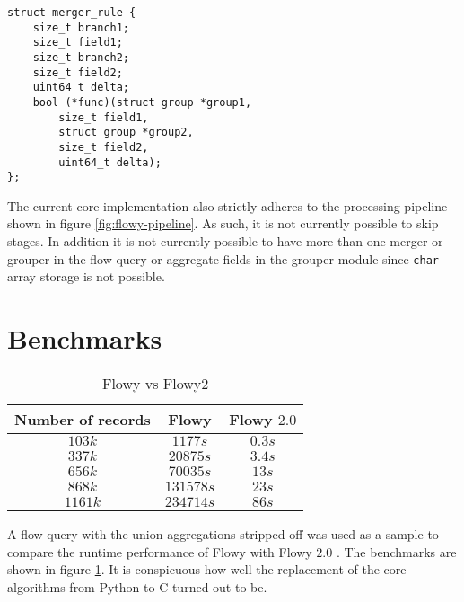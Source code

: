 \begin{lstlisting}
struct merger_rule {
	size_t branch1;
	size_t field1;
	size_t branch2;
	size_t field2;
	uint64_t delta;
	bool (*func)(struct group *group1,
		size_t field1,
		struct group *group2,
		size_t field2,
		uint64_t delta);
};
\end{lstlisting}

The current core implementation also strictly adheres to the processing
pipeline shown in figure \ref{fig:flowy-pipeline}. As such, it is not
currently possible to skip  stages. In addition it
is not currently possible to have more than one merger or grouper in the
flow-query or aggregate fields in the grouper module since \texttt{char} array
storage is not possible.


\section{Benchmarks}\label{sec:benchmarks}

\begin{table}[h!]
	\begin{center}
		\begin{tabular}{|c|c|c|}
		\hline
		Number of records & Flowy & Flowy $2.0$ \\
		\hline
		\hline
		$103k$ & $1177s$ & $0.3s$\\
		\hline
		$337k$ & $20875s$ & $3.4s$\\
		\hline
		$656k$ & $70035s$ & $13s$\\
		\hline
		$868k$ & $131578s$ & $23s$\\
		\hline
		$1161k$ & $234714s$ & $86s$\\
		\hline
		\end{tabular}
	\end{center}
\caption{Flowy vs Flowy2 \cite{jschauer:thesis:2011}}
\label{tab:flowy2-benchmarks}
\end{table}

A flow query with the union aggregations stripped off was used as a sample to
compare the runtime performance of Flowy \cite{kkanev:thesis:2009} with Flowy
$2.0$  \cite{jschauer:thesis:2011}. The
benchmarks are shown in figure \ref{tab:flowy2-benchmarks}. It is conspicuous
how well the replacement of the core algorithms from Python to C turned out to
be.

